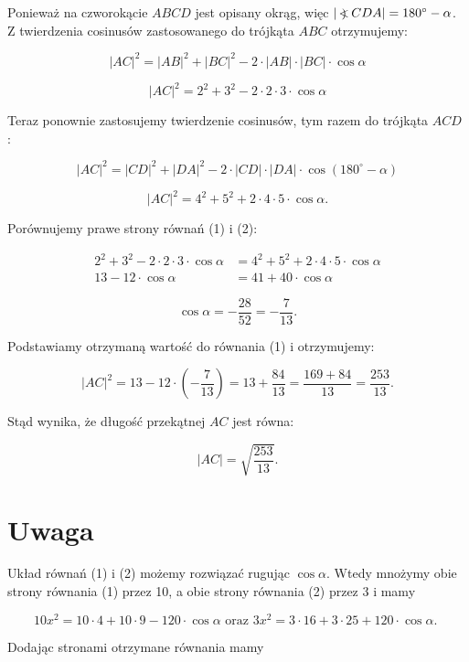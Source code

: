\documentclass[10pt]{article}
\newcommand\Varangle{\mathop{{<\!\!\!\!\!\text{\small)}}\:}\nolimits}
\begin{document}
Ponieważ na czworokącie $A B C D$ jest opisany okrąg, więc $|\Varangle C D A|=180^{\circ}-\alpha$.\\
Z twierdzenia cosinusów zastosowanego do trójkąta $A B C$ otrzymujemy:

$$
|A C|^{2}=|A B|^{2}+|B C|^{2}-2 \cdot|A B| \cdot|B C| \cdot \cos \alpha
$$


\begin{equation*}
|A C|^{2}=2^{2}+3^{2}-2 \cdot 2 \cdot 3 \cdot \cos \alpha \tag{1}
\end{equation*}


Teraz ponownie zastosujemy twierdzenie cosinusów, tym razem do trójkąta $A C D$ :

$$
|A C|^{2}=|C D|^{2}+|D A|^{2}-2 \cdot|C D| \cdot|D A| \cdot \cos \left(180^{\circ}-\alpha\right)
$$


\begin{equation*}
|A C|^{2}=4^{2}+5^{2}+2 \cdot 4 \cdot 5 \cdot \cos \alpha . \tag{2}
\end{equation*}


Porównujemy prawe strony równań (1) i (2):

$$
\begin{aligned}
2^{2}+3^{2}-2 \cdot 2 \cdot 3 \cdot \cos \alpha & =4^{2}+5^{2}+2 \cdot 4 \cdot 5 \cdot \cos \alpha \\
13-12 \cdot \cos \alpha & =41+40 \cdot \cos \alpha
\end{aligned}
$$

$$
\cos \alpha=-\frac{28}{52}=-\frac{7}{13} .
$$

Podstawiamy otrzymaną wartość do równania (1) i otrzymujemy:

$$
|A C|^{2}=13-12 \cdot\left(-\frac{7}{13}\right)=13+\frac{84}{13}=\frac{169+84}{13}=\frac{253}{13} .
$$

Stąd wynika, że długość przekątnej $A C$ jest równa:

$$
|A C|=\sqrt{\frac{253}{13}} .
$$

\section*{Uwaga}
Układ równań (1) i (2) możemy rozwiązać rugując $\cos \alpha$. Wtedy mnożymy obie strony równania (1) przez 10, a obie strony równania (2) przez 3 i mamy

$$
10 x^{2}=10 \cdot 4+10 \cdot 9-120 \cdot \cos \alpha \text { oraz } 3 x^{2}=3 \cdot 16+3 \cdot 25+120 \cdot \cos \alpha \text {. }
$$

Dodając stronami otrzymane równania mamy
\end{document}

